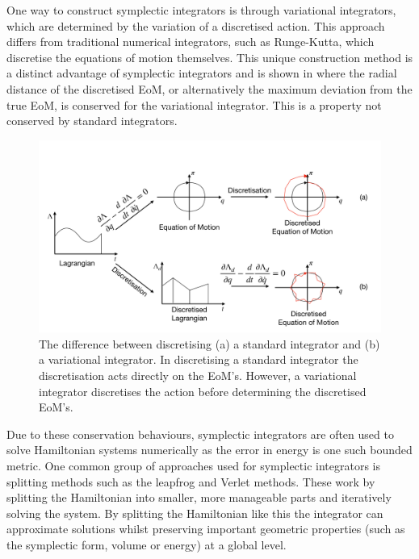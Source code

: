 \documentclass[10pt]{iopart}
\begin{document}
One way to construct symplectic integrators is through variational integrators, which are determined by the variation of a discretised action. This approach differs from traditional numerical integrators, such as Runge-Kutta, which discretise the equations of motion themselves. This unique construction method is a distinct advantage of symplectic integrators and is shown in  where the radial distance of the discretised EoM, or alternatively the maximum deviation from the true EoM, is conserved for the variational integrator. This is a property not conserved by standard integrators. 
\begin{figure}
	\centering
	\includegraphics[width=\columnwidth]{Variational.pdf}
	\caption{The difference between discretising (a) a standard integrator and (b)  a variational integrator. In discretising a standard integrator the discretisation acts directly on the EoM's. However, a variational integrator discretises the action before determining the discretised EoM's.}
		\label{VariationalIntegrator}
\end{figure}
Due to these conservation behaviours, symplectic integrators are often used to solve Hamiltonian systems numerically as the error in energy is one such bounded metric. 
One common group of approaches used for symplectic integrators is splitting methods such as the leapfrog and Verlet \cite{Verlet} methods. These work by splitting the Hamiltonian into smaller, more manageable parts and iteratively solving the system. By splitting the Hamiltonian like this the integrator can approximate solutions whilst preserving important geometric properties (such as the symplectic form, volume or energy) at a global level.
\\\\\\
\end{document}
